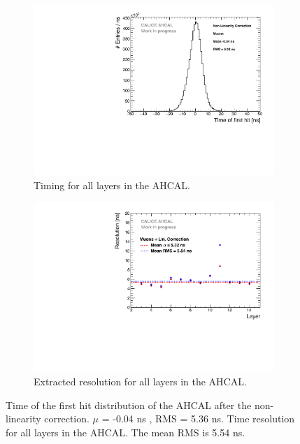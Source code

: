 \begin{figure}[t]
	\begin{subfigure}[t]{0.45\textwidth}
		\centering
		\includegraphics[width=1\textwidth]{chap5/fig_AHCAL_timing/Muons/Timing_AHCAL_LinCorrection.pdf}
		\caption{Timing for all layers in the AHCAL.}\label{fig:timing_lincorrection}
	\end{subfigure}
	\hfill
	\begin{subfigure}[t]{0.45\textwidth}
		\centering
		\includegraphics[width=1\textwidth]{chap5/fig_AHCAL_timing/Muons/ResolutionPerModule_LinCorrection.pdf}
		\caption{Extracted resolution for all layers in the AHCAL.}\label{fig:reso_lincorrection}
	\end{subfigure}
	\caption{ Time of the first hit distribution of the AHCAL after the non-linearity correction. $\mu$ = -0.04 ns , RMS = 5.36 ns.  Time resolution for all layers in the AHCAL. The mean RMS is 5.54 ns.}
\end{figure}

